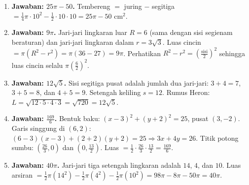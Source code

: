 \documentclass[a4paper,11pt]{article}
\newcommand{\dis}{\displaystyle}
\newcounter{no}
\begin{document}
\small\begin{enumerate}[leftmargin=2em,itemsep=2pt,topsep=2pt]
\item[\textbf{1.}] \textbf{Jawaban: $25\pi-50$.} Tembereng $=$ juring $-$ segitiga $=\frac14\pi\cdot10^2-\frac12\cdot10\cdot10=25\pi-50$ cm$^2$.
\item[\textbf{2.}] \textbf{Jawaban: $9\pi$.} Jari-jari lingkaran luar $R=6$ (sama dengan sisi segienam beraturan) dan jari-jari lingkaran dalam $r=3\sqrt3$. Luas cincin $=\pi(R^2-r^2)=\pi(36-27)=9\pi$. Perhatikan $R^2-r^2=\left(\frac{\text{sisi}}{2}\right)^2$ sehingga luas cincin selalu $\pi\left(\frac{6}{2}\right)^2$.
\item[\textbf{3.}] \textbf{Jawaban: $12\sqrt5$.} Sisi segitiga pusat adalah jumlah dua jari-jari: $3+4=7$, $3+5=8$, dan $4+5=9$. Setengah keliling $s=12$. Rumus Heron: $L=\sqrt{12\cdot5\cdot4\cdot3}=\sqrt{720}=12\sqrt5$.
\item[\textbf{4.}] \textbf{Jawaban: $\dis\frac{169}{6}$.} Bentuk baku: $(x-3)^2+(y+2)^2=25$, pusat $(3,-2)$. Garis singgung di $(6,2)$: $(6-3)(x-3)+(2+2)(y+2)=25\Rightarrow3x+4y=26$. Titik potong sumbu: $\left(\frac{26}{3},0\right)$ dan $\left(0,\frac{13}{2}\right)$. Luas $=\frac12\cdot\frac{26}{3}\cdot\frac{13}{2}=\frac{169}{6}$.
\item[\textbf{5.}] \textbf{Jawaban: $40\pi$.} Jari-jari tiga setengah lingkaran adalah $14$, $4$, dan $10$. Luas arsiran $=\frac12\pi(14^2)-\frac12\pi(4^2)-\frac12\pi(10^2)=98\pi-8\pi-50\pi=40\pi$.
\end{enumerate}
\par{}\par\vspace{0.2em}
\end{document}
